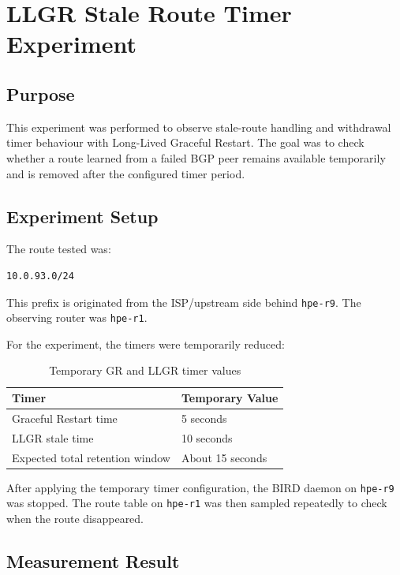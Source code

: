 \section{LLGR Stale Route Timer Experiment}

\subsection{Purpose}

This experiment was performed to observe stale-route handling and withdrawal timer behaviour with Long-Lived Graceful Restart. The goal was to check whether a route learned from a failed BGP peer remains available temporarily and is removed after the configured timer period.

\subsection{Experiment Setup}

The route tested was:

\begin{verbatim}
10.0.93.0/24
\end{verbatim}

This prefix is originated from the ISP/upstream side behind \texttt{hpe-r9}. The observing router was \texttt{hpe-r1}.

For the experiment, the timers were temporarily reduced:

\begin{table}[H]
\centering
\small
\renewcommand{\arraystretch}{1.25}
\begin{tabular}{|p{6cm}|p{5cm}|}
\hline
\textbf{Timer} & \textbf{Temporary Value} \\
\hline
Graceful Restart time & 5 seconds \\
\hline
LLGR stale time & 10 seconds \\
\hline
Expected total retention window & About 15 seconds \\
\hline
\end{tabular}
\caption{Temporary GR and LLGR timer values}
\end{table}

After applying the temporary timer configuration, the BIRD daemon on \texttt{hpe-r9} was stopped. The route table on \texttt{hpe-r1} was then sampled repeatedly to check when the route disappeared.

\subsection{Measurement Result}

